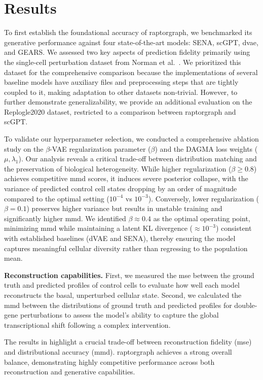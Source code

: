 \section*{Results}
To first establish the foundational accuracy of \gls{raptorgraph}, we benchmarked its generative performance against four state-of-the-art models: SENA, scGPT, \gls{dvae}, and GEARS.
We assessed two key aspects of prediction fidelity primarily using the single-cell perturbation dataset from Norman et al.~\cite{norman2019exploring}.
We prioritized this dataset for the comprehensive comparison because the implementations of several baseline models have auxiliary files and preprocessing steps that are tightly coupled to it, making adaptation to other datasets non-trivial.
However, to further demonstrate generalizability, we provide an additional evaluation on the Replogle2020 dataset, restricted to a comparison between \gls{raptorgraph} and scGPT.

To validate our hyperparameter selection, we conducted a comprehensive ablation study on the $\beta$-VAE regularization parameter ($\beta$) and the DAGMA loss weights ($\mu, \lambda_1$).
Our analysis reveals a critical trade-off between distribution matching and the preservation of biological heterogeneity.
While higher regularization ($\beta \geq 0.8$) achieves competitive \gls{mmd} scores, it induces severe posterior collapse, with the variance of predicted control cell states dropping by an order of magnitude compared to the optimal setting ($10^{-4}$ vs $10^{-3}$).
Conversely, lower regularization ($\beta = 0.1$) preserves higher variance but results in unstable training and significantly higher \gls{mmd}.
We identified $\beta \approx 0.4$ as the optimal operating point, minimizing \gls{mmd} while maintaining a latent KL divergence ($\approx 10^{-3}$) consistent with established baselines (dVAE and SENA), thereby ensuring the model captures meaningful cellular diversity rather than regressing to the population mean.

\textbf{Reconstruction capabilities.} First, we measured the \gls{mse} between the ground truth and predicted profiles of control cells to evaluate how well each model reconstructs the basal, unperturbed cellular state.
Second, we calculated the \gls{mmd} between the distributions of ground truth and predicted profiles for double-gene perturbations to assess the model's ability to capture the global transcriptional shift following a complex intervention.

The results in  highlight a crucial trade-off between reconstruction fidelity (\gls{mse}) and distributional accuracy (\gls{mmd}).
\Gls{raptorgraph} achieves a strong overall balance, demonstrating highly competitive performance across both reconstruction and generative capabilities.

